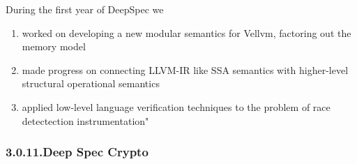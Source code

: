 \documentclass[12pt,twoside]{article}
\begin{document}
\noindent{}During the first year of DeepSpec we%

\begin{enumerate}%

\item{}
worked on developing a new modular semantics for Vellvm, factoring out the memory model%

\item{}
made progress on connecting LLVM-IR like SSA semantics with higher-level structural operational semantics%

\item{}
applied low-level language verification techniques to the problem of race detectection instrumentation"%
\end{enumerate}%

\subsubsection{3.0.11.\hspace*{0.5em}Deep Spec Crypto}\label{sec-deep-spec-crypto}%
\end{document}

